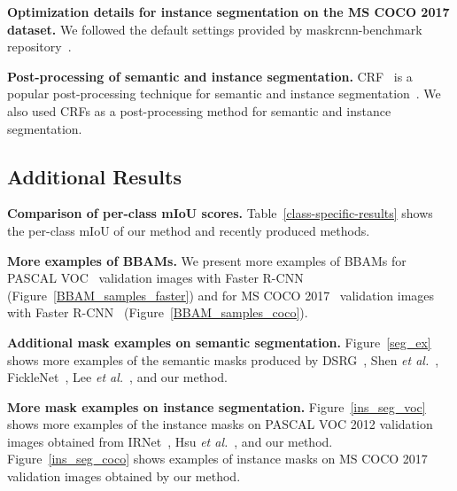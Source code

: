 \documentclass[final]{cvpr}
\begin{document}
\textbf{Optimization details for instance segmentation on the MS COCO 2017 dataset.}
We followed the default settings provided by maskrcnn-benchmark repository~\cite{massa2018mrcnn}.

\textbf{Post-processing of semantic and instance segmentation.}
CRF~\cite{krahenbuhl2011efficient} is a popular post-processing technique for semantic and instance segmentation~\cite{hsu2019weakly, lee2019ficklenet, lee2019frame, huang2018weakly, Shimoda_2019_ICCV}. 
We also used CRFs as a post-processing method for semantic and instance segmentation.

\subsection{Additional Results}

\textbf{Comparison of per-class mIoU scores.}
Table~\ref{class-specific-results} shows the per-class mIoU of our method and recently produced methods.



\textbf{More examples of BBAMs.}
We present more examples of BBAMs for PASCAL VOC~\cite{everingham2010pascal} validation images with Faster R-CNN~\cite{ren2015faster} (Figure~\ref{BBAM_samples_faster}) and for MS COCO 2017~\cite{lin2014microsoft} validation images with Faster R-CNN~\cite{ren2015faster} (Figure~\ref{BBAM_samples_coco}).


\textbf{Additional mask examples on semantic segmentation.}
Figure~\ref{seg_ex} shows more examples of the semantic masks produced by DSRG~\cite{huang2018weakly}, Shen \textit{et al.}~\cite{shen2018bootstrapping}, FickleNet~\cite{lee2019ficklenet}, Lee \textit{et al.}~\cite{lee2019frame}, and our method.

\textbf{More mask examples on instance segmentation.}
Figure~\ref{ins_seg_voc} shows more examples of the instance masks on PASCAL VOC 2012 validation images obtained from IRNet~\cite{ahn2019weakly}, Hsu \textit{et al.}~\cite{hsu2019weakly}, and our method.
Figure~\ref{ins_seg_coco} shows examples of instance masks on MS COCO 2017 validation images obtained by our method.
\end{document}

